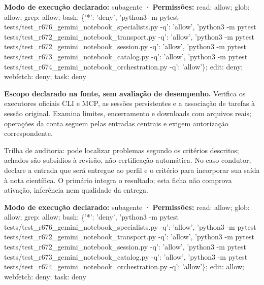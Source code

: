 \begin{arquitetura}
\textbf{Modo de execução declarado:} subagente · \textbf{Permissões:} read: allow; glob: allow; grep: allow; bash: \{'*': 'deny', 'python3 -m pytest tests/test\_r676\_gemini\_notebook\_specialists.py -q': 'allow', 'python3 -m pytest tests/test\_r672\_gemini\_notebook\_transport.py -q': 'allow', 'python3 -m pytest tests/test\_r672\_gemini\_notebook\_session.py -q': 'allow', 'python3 -m pytest tests/test\_r673\_gemini\_notebook\_catalog.py -q': 'allow', 'python3 -m pytest tests/test\_r674\_gemini\_notebook\_orchestration.py -q': 'allow'\}; edit: deny; webfetch: deny; task: deny
\end{arquitetura}


\begin{descricao}
\textbf{Escopo declarado na fonte, sem avaliação de desempenho.}
Verifica os executores oficiais CLI e MCP, as sessões persistentes e a associação de tarefas à sessão original. Examina limites, encerramento e downloads com arquivos reais; operações da conta seguem pelas entradas centrais e exigem autorização correspondente.
\end{descricao}

\begin{funcao}
Trilha de auditoria: pode localizar problemas segundo os critérios descritos; achados são subsídios à revisão, não certificação automática. No caso condutor, declare a entrada que será entregue ao perfil e o critério para incorporar sua saída à nota científica. O primário integra o resultado; esta ficha não comprova ativação, inferência nem qualidade da entrega.
\end{funcao}

\begin{arquitetura}
\textbf{Modo de execução declarado:} subagente · \textbf{Permissões:} read: allow; glob: allow; grep: allow; bash: \{'*': 'deny', 'python3 -m pytest tests/test\_r676\_gemini\_notebook\_specialists.py -q': 'allow', 'python3 -m pytest tests/test\_r672\_gemini\_notebook\_transport.py -q': 'allow', 'python3 -m pytest tests/test\_r672\_gemini\_notebook\_session.py -q': 'allow', 'python3 -m pytest tests/test\_r673\_gemini\_notebook\_catalog.py -q': 'allow', 'python3 -m pytest tests/test\_r674\_gemini\_notebook\_orchestration.py -q': 'allow'\}; edit: allow; webfetch: deny; task: deny
\end{arquitetura}

